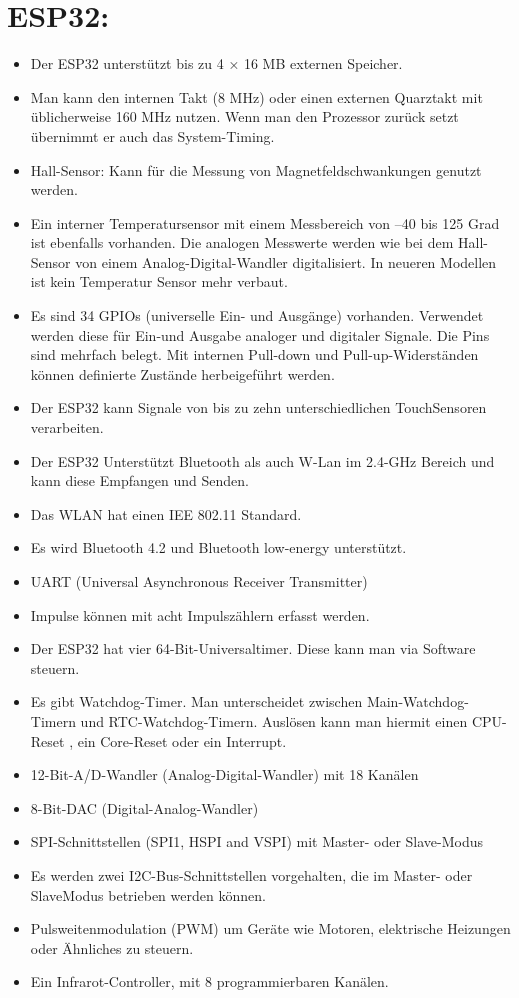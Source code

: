 

\section{ESP32:}


\textbf{}
\begin{itemize}
    \item Der ESP32 unterstützt bis zu 4 × 16 MB externen Speicher.
    \item Man kann den internen Takt (8 MHz) oder einen
    externen Quarztakt mit üblicherweise 160 MHz nutzen. 
    Wenn man den Prozessor zurück setzt übernimmt er auch das System-Timing.
    \item Hall-Sensor: Kann für die Messung von Magnetfeldschwankungen genutzt werden.
    \item Ein interner Temperatursensor mit einem Messbereich von –40 bis 125 Grad ist ebenfalls vorhanden.
    Die analogen Messwerte werden wie bei dem Hall-Sensor
    von einem Analog-Digital-Wandler digitalisiert. 
    In neueren Modellen ist kein Temperatur Sensor mehr verbaut.
    \item Es sind 34 GPIOs (universelle Ein- und Ausgänge) vorhanden. 
    Verwendet werden diese für Ein-und Ausgabe analoger und digitaler Signale. 
    Die Pins sind mehrfach belegt. 
    Mit internen Pull-down und Pull-up-Widerständen können definierte Zustände herbeigeführt werden.
    \item Der ESP32 kann Signale von bis zu zehn unterschiedlichen TouchSensoren verarbeiten. 
    \item Der ESP32 Unterstützt Bluetooth als auch W-Lan im 2.4-GHz Bereich und kann diese 
    Empfangen und Senden. 
    \item Das WLAN hat einen IEE 802.11 Standard.
    \item Es wird Bluetooth 4.2 und Bluetooth low-energy unterstützt.
    \item UART (Universal Asynchronous Receiver Transmitter) 
    \item Impulse können mit acht Impulszählern erfasst werden. 
    \item Der ESP32 hat vier 64-Bit-Universaltimer. Diese kann man via Software steuern.
    \item Es gibt Watchdog-Timer. Man unterscheidet zwischen Main-Watchdog-Timern und RTC-Watchdog-Timern. 
    Auslösen kann man hiermit einen CPU-Reset , ein Core-Reset oder ein Interrupt.
    \item  12-Bit-A/D-Wandler (Analog-Digital-Wandler) mit 18 Kanälen 
    \item  8-Bit-DAC (Digital-Analog-Wandler)
    \item SPI-Schnittstellen (SPI1, HSPI and VSPI) mit Master- oder Slave-Modus
    \item Es werden zwei I2C-Bus-Schnittstellen vorgehalten, die im Master- oder SlaveModus betrieben werden können.
    \item Pulsweitenmodulation (PWM) um Geräte wie Motoren, elektrische Heizungen oder Ähnliches zu steuern. 
    \item Ein Infrarot-Controller, mit 8 programmierbaren Kanälen.
    
\end{itemize}

